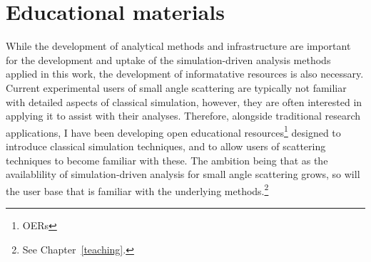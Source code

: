 \section{Educational materials}

While the development of analytical methods and infrastructure are important for the development and uptake of the simulation-driven analysis methods applied in this work, the development of informatative resources is also necessary.
Current experimental users of small angle scattering are typically not familiar with detailed aspects of classical simulation, however, they are often interested in applying it to assist with their analyses.
Therefore, alongside traditional research applications, I have been developing open educational resources\footnote{OERs} designed to introduce classical simulation techniques, and to allow users of scattering techniques to become familiar with these.
The ambition being that as the availablility of simulation-driven analysis for small angle scattering grows, so will the user base that is familiar with the underlying methods.\footnote{See Chapter~\ref{teaching}.}
